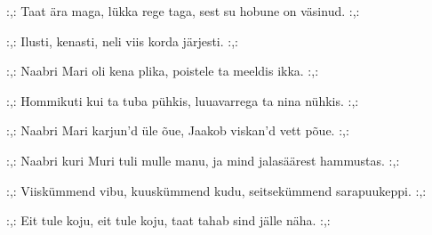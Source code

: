 :,: Taat \"ara maga, l\"ukka rege taga,
    sest su hobune on v\"asinud. :,: 

:,: Ilusti, kenasti,
neli viis korda j\"arjesti. :,: 

:,: Naabri Mari oli kena plika,
    poistele ta meeldis ikka. :,: 

:,: Hommikuti kui ta tuba p\"uhkis,
    luuavarrega ta nina n\"uhkis. :,: 

:,: Naabri Mari karjun'd \"ule \~oue,
    Jaakob viskan'd vett p\~oue. :,: 

:,: Naabri kuri Muri tuli mulle manu,
    ja mind jalas\"a\"arest hammustas. :,: 

:,: Viisk\"ummend vibu, kuusk\"ummend kudu,
    seitsek\"ummend sarapuukeppi. :,: 

:,: Eit tule koju, eit tule koju,
    taat tahab sind j\"alle n\"aha. :,: 